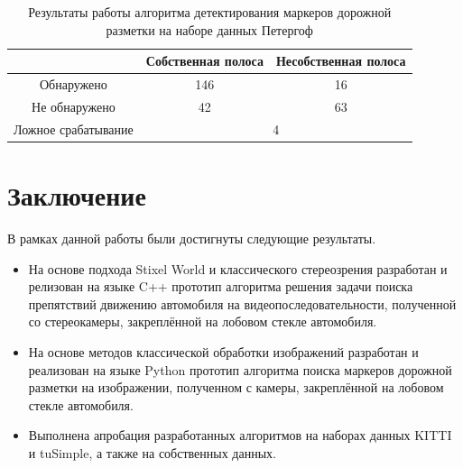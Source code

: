 \documentclass[aps,%
14pt,%
final,%
oneside,
onecolumn,%
musixtex, %
superscriptaddress,%
centertags]{extarticle} %
\begin{document}
\begin{table}
\center
\begin{tabular}{|c|c|c|}
\hline
			& Собственная полоса & Несобственная полоса \\
\hline
	Обнаружено				& 146 & 16\\
\hline
	Не обнаружено			& 42  & 63\\
\hline
	Ложное срабатывание		& \multicolumn{2}{c|}{4}\\
\hline
\end{tabular}
\caption{Результаты работы алгоритма детектирования маркеров дорожной разметки на наборе данных Петергоф}
\label{tab:lanes_peterhof}
\end{table}

\newpage
\section{Заключение}

В рамках данной работы были достигнуты следующие результаты.

\begin{itemize}
\item На основе подхода Stixel World и классического стереозрения разработан и релизован на языке C++ прототип алгоритма решения задачи поиска препятствий движению автомобиля на видеопоследовательности, полученной со стереокамеры, закреплённой на лобовом стекле автомобиля.

\item На основе методов классической обработки изображений разработан и реализован на языке Python прототип алгоритма поиска маркеров дорожной разметки на изображении, полученном с камеры, закреплённой на лобовом стекле автомобиля.

\item Выполнена апробация разработанных алгоритмов на наборах данных KITTI и tuSimple, а также на собственных данных.

\end{itemize}

\newpage



\end{document}
